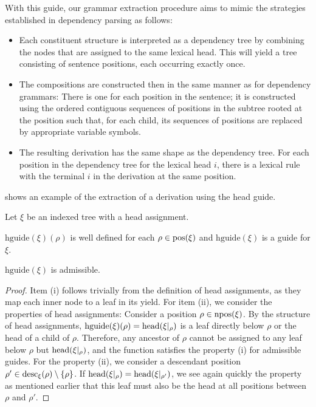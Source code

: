 \documentclass[../../document.tex]{subfiles}
\begin{document}
    With this guide, our grammar extraction procedure aims to mimic the strategies established in dependency parsing \citep{kuhlmann2009treebank} as follows:
    \begin{itemize}
        \item Each constituent structure is interpreted as a dependency tree by combining the nodes that are assigned to the same lexical head. This will yield a tree consisting of sentence positions, each occurring exactly once.
        \item The  compositions are constructed then in the same manner as for dependency grammars: There is one for each position in the sentence; it is constructed using the ordered contiguous sequences of positions in the subtree rooted at the position such that, for each child, its sequences of positions are replaced by appropriate variable symbols.
        \item The resulting derivation has the same shape as the dependency tree. For each position in the dependency tree for the lexical head \(i\), there is a lexical rule with the terminal \(i\) in the derivation at the same position.
    \end{itemize}
     shows an example of the extraction of a derivation using the head guide.

    \begin{theorem}
        Let \(\xi\) be an indexed tree with a head assignment.
        \begin{compactenum}
            \item \(\mathrm{hguide}(\xi)(\rho)\) is well defined for each \(\rho \in \operatorname{pos}(\xi)\) and \(\mathrm{hguide}(\xi)\) is a guide for \(\xi\).
            \item \(\mathrm{hguide}(\xi)\) is admissible.
        \end{compactenum}
    \end{theorem}

    \begin{proof}
        Item (i) follows trivially from the definition of head assignments, as they map each inner node to a leaf in its yield.
        For item (ii), we consider the properties of head assignments:
        Consider a position \(\rho \in \operatorname{npos}(\xi)\).
        By the structure of head assignments, \(\mathrm{hguide}(\xi)(\rho) = \operatorname{head}(\xi|_\rho)\) is a leaf directly below \(\rho\) or the head of a child of \(\rho\).
        Therefore, any ancestor of \(\rho\) cannot be assigned to any leaf below \(\rho\) but \(\operatorname{head}(\xi|_\rho)\), and the function satisfies the property (i) for admissible guides.
        For the property (ii), we consider a descendant position \(\rho' \in \operatorname{desc}_\xi(\rho) \setminus \{\rho\}\).
        If \(\operatorname{head}(\xi|_\rho) = \operatorname{head}(\xi|_{\rho'})\), we see again quickly the property as mentioned earlier that this leaf must also be the head at all positions between \(\rho\) and \(\rho'\).
    \end{proof}
\end{document}

